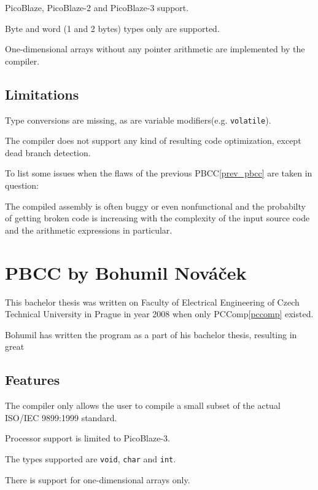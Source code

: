         PicoBlaze, PicoBlaze-2 and PicoBlaze-3 support.

        Byte and word (1 and 2 bytes) types only are supported.

        One-dimensional arrays without any pointer arithmetic are implemented by the compiler.

        \subsection{Limitations}

        Type conversions are missing, as are variable modifiers(e.g. \texttt{volatile}). 

        The compiler does not support any kind of resulting code optimization, except dead branch detection.

        To list some issues when the flaws of the previous PBCC\ref{prev_pbcc} are taken in question:

        The compiled assembly is often buggy or even nonfunctional and the probabilty of getting broken code is increasing with the complexity of the input source code and the arithmetic expressions in particular.

    \section{PBCC by Bohumil Nováček}\label{not_quite_c}

    This bachelor thesis was written on Faculty of Electrical Engineering of Czech Technical University in Prague in year 2008 when only PCComp\ref{pccomp} existed.

    Bohumil has written the program as a part of his bachelor thesis, resulting in great 

        \subsection{Features}

        The compiler only allows the user to compile a small subset of the actual ISO/IEC 9899:1999 standard.

        Processor support is limited to PicoBlaze-3.

        The types supported are \texttt{void}, \texttt{char} and \texttt{int}.

        There is support for one-dimensional arrays only.

